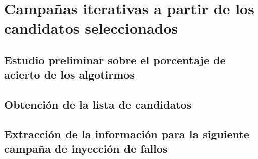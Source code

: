 \chapter{Campañas iterativas a partir de los candidatos seleccionados}
\label{ch:CampanasIterativas}

\lettrine[lraise=-0.1, lines=2, loversize=0.2]{}{}



\section{Estudio preliminar sobre el porcentaje de acierto de los algotirmos}
\label{sec:EstudioAcierto}


\section{Obtención de la lista de candidatos}
\label{sec:Candidatos}



\section{Extracción de la información para la siguiente campaña de inyección de
fallos}
\label{sec:InfoCampana}



